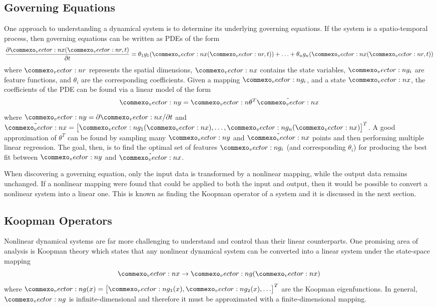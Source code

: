 \documentclass{article}
\renewcommand{\vec}[1]{\vect{#1}}
\begin{document}
\subsection{Governing Equations}
One approach to understanding a dynamical system is to determine its underlying governing equations. If the system is a spatio-temporal process, then governing equations can be written as PDEs of the form
\begin{equation}
    \frac{\partial \vec{x} (\vec{r},t)}{\partial t} = \theta_1 g_1(\vec{x}(\vec{r},t)) + \ldots + \theta_n g_n(\vec{x}(\vec{r},t))
\end{equation}
where $\vec{r}$ represents the spatial dimensions, $\vec{x}$ contains the state variables, $\vec{g}_i$ are feature functions, and $\theta_i$ are the corresponding coefficients. Given a mapping $\vec{g}_i$, and a state $\vec{x}$, the coefficients of the PDE can be found via a linear model of the form 
\begin{equation}
 \vec{y} = \vec{\theta}^T \tilde{\vec{x}}
 \end{equation}
where $\vec{y} = \partial \vec{x}/ \partial t$ and $\tilde{\vec{x}} = \begin{bmatrix} \vec{g}_1(\vec{x}), \ldots, \vec{g}_n(\vec{x}) \end{bmatrix}^T$. A good approximation of $\theta^T$ can be found by sampling many $\vec{y}$ and $\tilde{\vec{x}}$ points and then performing multiple linear regression. The goal, then, is to find the optimal set of features $\vec{g}_i$ (and corresponding $\theta_i$) for producing the best fit between $\vec{y}$ and $\tilde{\vec{x}}$.

When discovering a governing equation, only the input data is transformed by a nonlinear mapping, while the output data remains unchanged. If a nonlinear mapping were found that could be applied to both the input and output, then it would be possible to convert a nonlinear system into a linear one. This is known as finding the Koopman operator of a system and it is discussed in the next section.

\subsection{Koopman Operators}
Nonlinear dynamical systems are far more challenging to understand and control than their linear counterparts. One promising area of analysis is Koopman theory \cite{korda2018linear} which states that any nonlinear dynamical system can be converted into a linear system under the state-space mapping
\begin{equation}
\vec{x} \rightarrow \vec{g}(\vec{x})
\end{equation}
where $\vec{g}(x) = \begin{bmatrix} \vec{g}_1(x), \vec{g}_2(x), \ldots \end{bmatrix}^T$ are the Koopman eigenfunctions. In general, $\vec{g}$ is infinite-dimensional and therefore it must be approximated with a finite-dimensional mapping.
\end{document}
